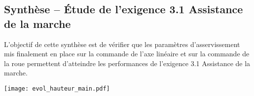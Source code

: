 \ifprof
\else
%
%
%
%
%
%
%
%
\fi


\subsection*{Synthèse -- Étude de l'exigence 3.1 \og Assistance de la marche\fg{}}
\ifprof
\else
L'objectif de cette synthèse est de vérifier que les paramètres d'asservissement mis finalement en place sur la commande de l'axe linéaire et sur la commande de la roue permettent d'atteindre les performances de l'exigence 3.1 \og Assistance de la marche\fg{}.

\begin{marginfigure}%
\texttt{[image: evol\_hauteur\_main.pdf]}
   \caption{
   { Hauteur de la main au cours de la marche pour $V = 0,22$ m/s
}
\label{fig:evol_hauteur_main}
}
\end{marginfigure}

